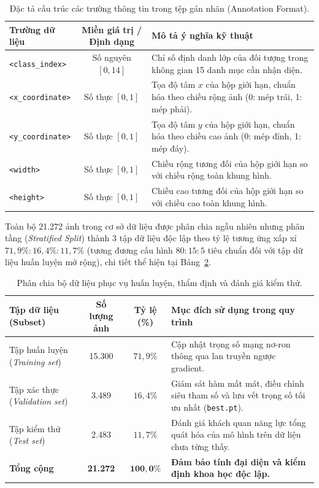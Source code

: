 \begin{table}[htbp]
\centering
\caption{Đặc tả cấu trúc các trường thông tin trong tệp gán nhãn (Annotation Format).}
\label{tab:details_of_annotations}
\small
\begin{tabular}{|l|c|p{7.8cm}|}
\hline
\textbf{Trường dữ liệu} & \textbf{Miền giá trị / Định dạng} & \textbf{Mô tả ý nghĩa kỹ thuật} \\ \hline
\texttt{<class\_index>} & Số nguyên $[0, 14]$ & Chỉ số định danh lớp của đối tượng trong không gian 15 danh mục cần nhận diện. \\ \hline
\texttt{<x\_coordinate>} & Số thực $[0, 1]$ & Tọa độ tâm $x$ của hộp giới hạn, chuẩn hóa theo chiều rộng ảnh (0: mép trái, 1: mép phải). \\ \hline
\texttt{<y\_coordinate>} & Số thực $[0, 1]$ & Tọa độ tâm $y$ của hộp giới hạn, chuẩn hóa theo chiều cao ảnh (0: mép đỉnh, 1: mép đáy). \\ \hline
\texttt{<width>} & Số thực $[0, 1]$ & Chiều rộng tương đối của hộp giới hạn so với chiều rộng toàn khung hình. \\ \hline
\texttt{<height>} & Số thực $[0, 1]$ & Chiều cao tương đối của hộp giới hạn so với chiều cao toàn khung hình. \\ \hline
\end{tabular}
\end{table}

Toàn bộ 21.272 ảnh trong cơ sở dữ liệu được phân chia ngẫu nhiên nhưng phân tầng (\textit{Stratified Split}) thành 3 tập dữ liệu độc lập theo tỷ lệ tương ứng xấp xỉ $71,9\% : 16,4\% : 11,7\%$ (tương đương cấu hình $80:15:5$ tiêu chuẩn đối với tập dữ liệu huấn luyện mở rộng), chi tiết thể hiện tại Bảng~\ref{tab:dataset_split_statistics}.

\begin{table}[htbp]
\centering
\caption{Phân chia bộ dữ liệu phục vụ huấn luyện, thẩm định và đánh giá kiểm thử.}
\label{tab:dataset_split_statistics}
\begin{tabular}{|l|c|c|p{7.2cm}|}
\hline
\textbf{Tập dữ liệu (Subset)} & \textbf{Số lượng ảnh} & \textbf{Tỷ lệ (\%)} & \textbf{Mục đích sử dụng trong quy trình} \\ \hline
Tập huấn luyện (\textit{Training set}) & 15.300 & $71,9\%$ & Cập nhật trọng số mạng nơ-ron thông qua lan truyền ngược gradient. \\ \hline
Tập xác thực (\textit{Validation set}) & 3.489 & $16,4\%$ & Giám sát hàm mất mát, điều chỉnh siêu tham số và lưu vết trọng số tối ưu nhất (\texttt{best.pt}). \\ \hline
Tập kiểm thử (\textit{Test set}) & 2.483 & $11,7\%$ & Đánh giá khách quan năng lực tổng quát hóa của mô hình trên dữ liệu chưa từng thấy. \\ \hline
\textbf{Tổng cộng} & \textbf{21.272} & $\mathbf{100,0\%}$ & \textbf{Đảm bảo tính đại diện và kiểm định khoa học độc lập.} \\ \hline
\end{tabular}
\end{table}

